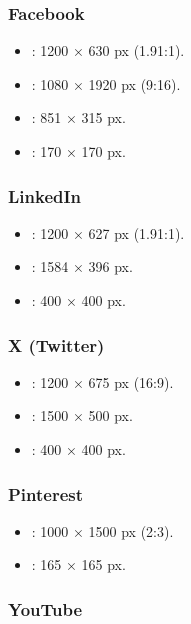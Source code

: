 \subsubsection{Facebook}

\begin{itemize}
    \item {} : 1200 × 630 px (1.91:1).
    \item {} : 1080 × 1920 px (9:16).
    \item {} : 851 × 315 px.
    \item {} : 170 × 170 px.
\end{itemize}

\subsubsection{LinkedIn}

\begin{itemize}
    \item {} : 1200 × 627 px (1.91:1).
    \item {} : 1584 × 396 px.
    \item {} : 400 × 400 px.
\end{itemize}

\subsubsection{X (Twitter)}

\begin{itemize}
    \item {} : 1200 × 675 px (16:9).
    \item {} : 1500 × 500 px.
    \item {} : 400 × 400 px.
\end{itemize}

\subsubsection{Pinterest}

\begin{itemize}
    \item {} : 1000 × 1500 px (2:3).
    \item {} : 165 × 165 px.
\end{itemize}

\subsubsection{YouTube}

